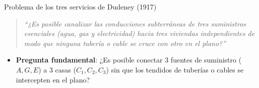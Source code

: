 \documentclass[
  ignorenonframetext,
]{beamer}
\providecommand{\tightlist}{%
  \setlength{\itemsep}{0pt}\setlength{\parskip}{0pt}}
\begin{document}
\begin{frame}{Problema de los tres servicios de Dudeney (1917)}
\label{problema-de-los-tres-servicios-de-dudeney-1917}
\begin{tcolorbox}[enhanced jigsaw, left=2mm, opacityback=0, titlerule=0mm, breakable, toptitle=1mm, rightrule=.15mm, bottomtitle=1mm, coltitle=black, title=\textcolor{quarto-callout-note-color}{\faInfo}\hspace{0.5em}{Acertijo de Henry Ernest Dudeney (1917)}, colframe=quarto-callout-note-color-frame, colbacktitle=quarto-callout-note-color!10!white, arc=.35mm, toprule=.15mm, leftrule=.75mm, bottomrule=.15mm, opacitybacktitle=0.6, colback=white]

\begin{quote}
\emph{``¿Es posible canalizar las conducciones subterráneas de tres
suministros esenciales (agua, gas y electricidad) hacia tres viviendas
independientes de modo que ninguna tubería o cable se cruce con otro en
el plano?''}
\end{quote}

\end{tcolorbox}

\begin{itemize}
\tightlist
\item
  \textbf{Pregunta fundamental}: ¿Es posible conectar 3 fuentes de
  suministro (\(A, G, E\)) a 3 casas (\(C_1, C_2, C_3\)) sin que los
  tendidos de tuberías o cables se intercepten en el plano?
\end{itemize}
\end{frame}
\end{document}
